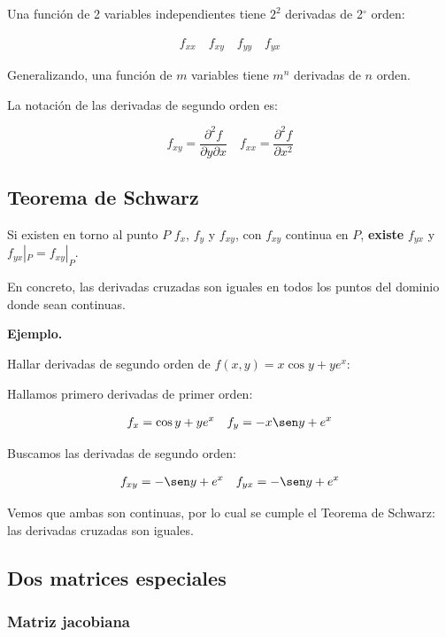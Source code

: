 Una función de 2 variables independientes tiene \(2^{2}\)
derivadas de 2\(^{\circ}\) orden:

\begin{align*}
    f_{xx} \quad f_{xy} \quad f_{yy} \quad f_{yx}
\end{align*}

Generalizando,
una función de \(m\) variables tiene \(m^{n}\) derivadas de \(n\) orden.

La notación de las derivadas de segundo orden es:

\begin{equation*}
    f_{xy} = \frac{\partial^{2} f}{\partial y \partial x} \quad
    f_{xx} = \frac{\partial^{2} f}{\partial x^{2}}
\end{equation*}

\subsection{Teorema de Schwarz}

Si existen en torno al punto \(P\) \(f_x\),
\(f_y\)
y \(f_{xy}\),
con \(f_{xy}\) continua en \(P\),
\textbf{existe} \(f_{yx}\) y \(f_{yx}|_P = f_{xy}|_P\).

En concreto,
las derivadas cruzadas son iguales
en todos los puntos del dominio donde sean continuas.

\vspace{.5cm}
\textbf{Ejemplo.}

Hallar derivadas de segundo orden de \(f(x,y) = x \cos y + ye^{x}\):

Hallamos primero derivadas de primer orden:

\begin{align*}
    f_x = \cos y + ye^{x} \quad f_y = -x\sen y + e^{x}
\end{align*}

Buscamos las derivadas de segundo orden:

\begin{align*}
    f_{xy} = -\sen y + e^{x} \quad f_{yx} = -\sen y + e^{x}
\end{align*}

Vemos que ambas son continuas,
por lo cual se cumple el Teorema de Schwarz:
las derivadas cruzadas son iguales.

\subsection{Dos matrices especiales}

\subsubsection{Matriz jacobiana}

